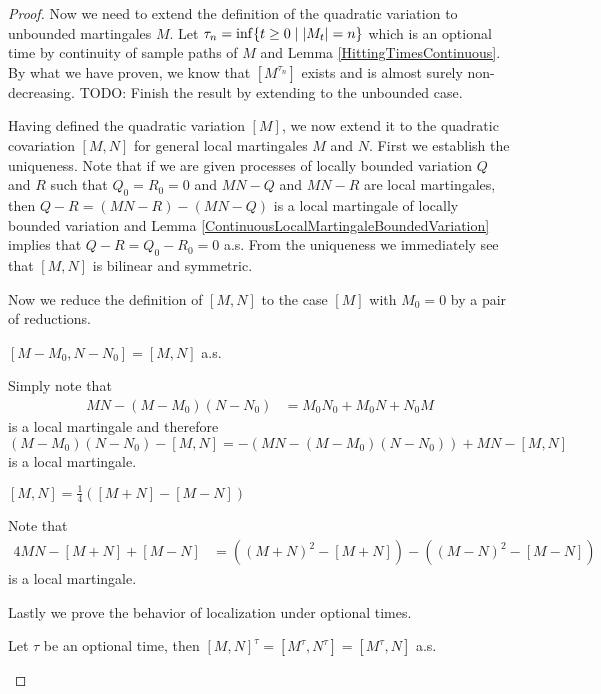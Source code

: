 \begin{proof}
Now we need to extend the definition of the quadratic variation to unbounded martingales $M$.  Let $\tau_n = \inf \lbrace t \geq 0 \mid \left \vert M_t \right \vert = n \rbrace$ which is an optional time by continuity of sample paths of $M$ and Lemma \ref{HittingTimesContinuous}.  By what we have proven, we know that $[M^{\tau_n}]$ exists and is almost surely non-decreasing.
TODO: Finish the result by extending to the unbounded case.

Having defined the quadratic variation $[M]$, we now extend it to the quadratic covariation $[M,N]$ for general local martingales $M$ and $N$.  First we establish the uniqueness.  Note that if we are given processes of locally bounded variation $Q$ and $R$ such that $Q_0 = R_0 = 0$ and $MN - Q$ and $MN - R$ are local martingales, then $Q-R = (MN -R) - (MN -Q)$ is a local martingale of locally bounded variation and Lemma \ref{ContinuousLocalMartingaleBoundedVariation} implies that $Q - R = Q_0 - R_0 = 0$ a.s.  From the uniqueness we immediately see that $[M,N]$ is bilinear and symmetric.

Now we reduce the definition of $[M,N]$ to the case $[M]$ with $M_0 = 0$ by a pair of reductions.

\begin{clm}$[M-M_0,N-N_0] = [M,N]$ a.s.
\end{clm}

Simply note that 
\begin{align*}
MN - (M-M_0)(N-N_0) &= M_0 N_0 + M_0 N + N_0 M
\end{align*}
is a local martingale and therefore $(M-M_0)(N-N_0) - [M,N] = -(MN - (M-M_0)(N-N_0) ) + MN - [M,N]$ is a local martingale.

\begin{clm}$[M,N] = \frac{1}{4} ([M+N] - [M-N])$
\end{clm}

Note that 
\begin{align*}
4 MN - [M+N] + [M-N] &= ((M+N)^2 - [M+N]) - ((M-N)^2 - [M-N])
\end{align*}
is a local martingale.

Lastly we prove the behavior of localization under optional times.
\begin{clm}Let $\tau$ be an optional time, then $[M,N]^\tau = [M^\tau, N^\tau] = [M^\tau,N]$ a.s.
\end{clm}


\end{proof}
